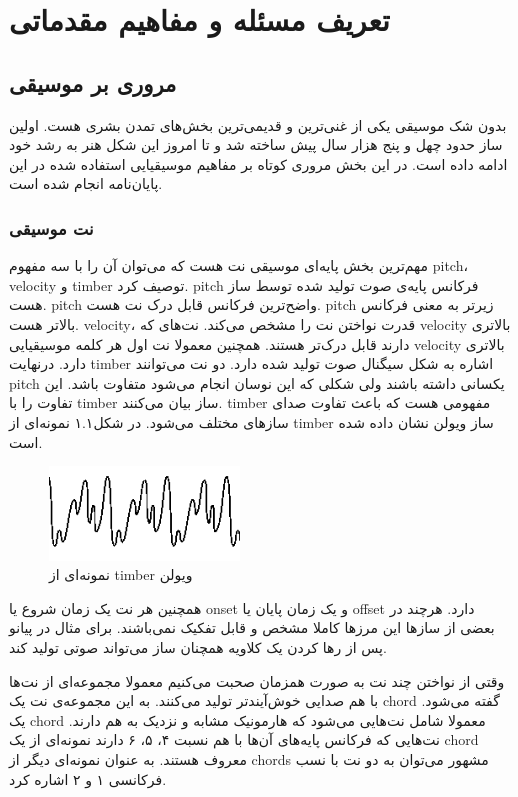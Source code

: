 \chapter{تعریف مسئله و مفاهیم مقدماتی}
\section{مروری بر موسیقی}
بدون شک موسیقی یکی از غنی‌ترین و قدیمی‌ترین بخش‌های تمدن بشری هست. اولین ساز
حدود چهل و پنج هزار سال پیش ساخته شد و تا امروز این شکل هنر به رشد خود ادامه‌
داده است. در این بخش مروری کوتاه بر مفاهیم موسیقیایی استفاده شده در این
پایان‌نامه انجام شده است.

\subsection{نت موسیقی}
مهم‌ترین بخش پایه‌ای موسیقی نت هست که می‌توان آن را با سه مفهوم \gls{pitch}،
\gls{velocity} و \gls{timber} توصیف کرد. \gls{pitch} فرکانس پایه‌‌ی صوت تولید
شده توسط ساز هست. \gls{pitch} واضح‌ترین فرکانس قابل درک نت هست. \gls{pitch}
زیرتر به معنی فرکانس بالاتر هست. \gls{velocity}، قدرت نواختن نت را مشخص می‌کند.
نت‌های که \gls{velocity} بالاتری دارند قابل درک‌تر هستند. همچنین معمولا نت اول
هر کلمه موسیقیایی \gls{velocity} بالاتری دارد. درنهایت \gls{timber} اشاره به شکل
سیگنال صوت تولید شده دارد. دو نت می‌توانند \gls{pitch} یکسانی داشته باشند ولی
شکلی که این نوسان انجام می‌شود متفاوت باشد. این تفاوت را با \gls{timber} ساز
بیان می‌کنند. \gls{timber} مفهومی هست که باعث تفاوت صدای سازهای مختلف می‌شود. در
شکل۱.۱ نمونه‌ای از \gls{timber} ساز ویولن نشان داده شده است.
\begin{figure}
    \centering
    \includegraphics[height=2.5cm]{./statics/note_visualized.png}
    \caption{نمونه‌ای از \gls{timber} ویولن}
\end{figure}

همچنین هر نت یک زمان شروع یا onset و یک زمان پایان یا offset دارد. هرچند در بعضی
از سازها این مرزها کاملا مشخص و قابل تفکیک نمی‌باشند. برای مثال در پیانو پس از
رها کردن یک کلاویه همچنان ساز می‌تواند صوتی تولید کند.

وقتی از نواختن چند نت به صورت همزمان صحبت می‌کنیم معمولا مجموعه‌ای از نت‌ها با
هم صدایی خوش‌آیندتر تولید می‌کنند. به این مجموعه‌ی نت یک \gls{chord} گفته
می‌شود. یک \gls{chord} معمولا شامل نت‌هایی می‌شود که هارمونیک مشابه و نزدیک به
هم دارند. نت‌هایی که فرکانس پایه‌های آن‌ها با هم نسبت ۴، ۵، ۶ دارند نمونه‌ای از
یک \gls{chord} معروف هستند. به عنوان نمونه‌ای دیگر از \glspl{chord} مشهور
می‌توان به دو نت با نسب فرکانسی ۱ و ۲ اشاره کرد.

